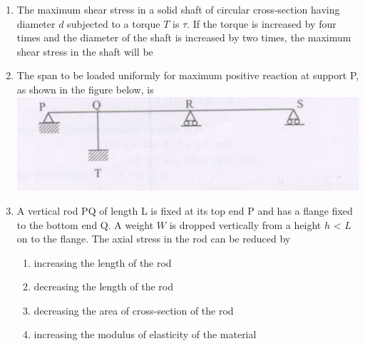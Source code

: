 \documentclass[journal]{IEEEtran}
\begin{document}
\begin{enumerate}
\item The maximum shear stress in a solid shaft of circular cross-section having diameter $d$ subjected to a torque $T$ is $\tau$. If the torque is increased by four times and the diameter of the shaft is increased by two times, the maximum shear stress in the shaft will be  \hfill {}
\begin{enumerate}
\end{enumerate}

\item The span to be loaded uniformly for maximum positive  reaction at support P, as shown in the figure below, is \hfill {}
\includegraphics[width=\columnwidth]{figs/fig8.png} 

\vspace{0.1cm}

\begin{enumerate}
\end{enumerate}

\item A vertical rod PQ of length L is fixed at its top end P and has a flange fixed to the bottom end Q. A weight $W$ is dropped vertically from a height $h$ < $L$ on to the flange. The axial stress in the rod can be reduced by \hfill {}

\begin{enumerate}
\item increasing the length of the rod 
\item decreasing the length of the rod
\item decreasing the area of cross-section of the rod
\item increasing the modulus of elasticity of the material
\end{enumerate}


\end{enumerate}
\end{document}

